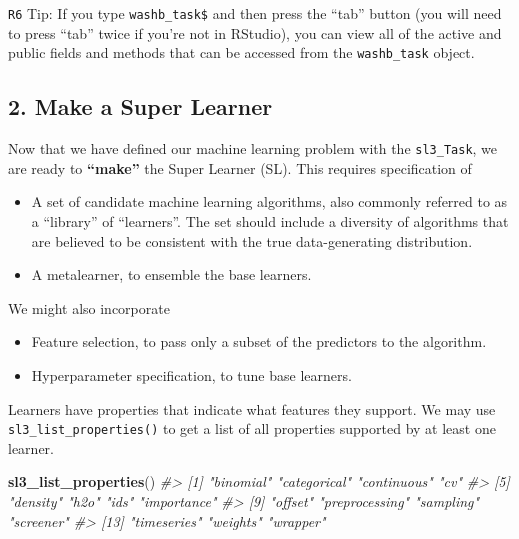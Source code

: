 \documentclass[12pt, krantz2,]{book}
\newenvironment{Shaded}{\begin{snugshade}}{\end{snugshade}}
\newcommand{\CommentTok}[1]{\textcolor[rgb]{0.56,0.35,0.01}{\textit{#1}}}
\newcommand{\KeywordTok}[1]{\textcolor[rgb]{0.13,0.29,0.53}{\textbf{#1}}}
\newcommand{\NormalTok}[1]{#1}
\providecommand{\tightlist}{%
  \setlength{\itemsep}{0pt}\setlength{\parskip}{0pt}}
\theoremstyle{definition}
\theoremstyle{definition}
\theoremstyle{definition}
\newcommand{\1}{\mathbbm{1}}
\begin{document}
\texttt{R6} Tip: If you type \texttt{washb\_task\$} and then press the ``tab'' button (you will
need to press ``tab'' twice if you're not in RStudio), you can view all of the
active and public fields and methods that can be accessed from the \texttt{washb\_task}
object.

\hypertarget{make-a-super-learner}{%
\subsection*{2. Make a Super Learner}\label{make-a-super-learner}}


Now that we have defined our machine learning problem with the \texttt{sl3\_Task}, we
are ready to \textbf{``make''} the Super Learner (SL). This requires specification of

\begin{itemize}
\tightlist
\item
  A set of candidate machine learning algorithms, also commonly referred to as
  a ``library'' of ``learners''. The set should include a diversity of algorithms
  that are believed to be consistent with the true data-generating
  distribution.
\item
  A metalearner, to ensemble the base learners.
\end{itemize}

We might also incorporate

\begin{itemize}
\tightlist
\item
  Feature selection, to pass only a subset of the predictors to the algorithm.
\item
  Hyperparameter specification, to tune base learners.
\end{itemize}

Learners have properties that indicate what features they support. We may use
\texttt{sl3\_list\_properties()} to get a list of all properties supported by at least
one learner.

\begin{Shaded}
\begin{Highlighting}[]
\KeywordTok{sl3_list_properties}\NormalTok{()}
\CommentTok{#>  [1] "binomial"      "categorical"   "continuous"    "cv"           }
\CommentTok{#>  [5] "density"       "h2o"           "ids"           "importance"   }
\CommentTok{#>  [9] "offset"        "preprocessing" "sampling"      "screener"     }
\CommentTok{#> [13] "timeseries"    "weights"       "wrapper"}
\end{Highlighting}
\end{Shaded}
\end{document}
